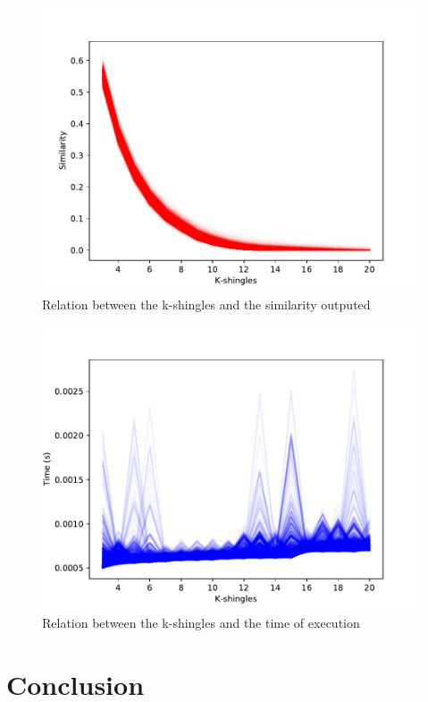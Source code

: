 \documentclass[12pt]{article}
\begin{document}
\begin{figure}[h]
	\includegraphics[scale=1]{JaccardSimilarityValueKshingles} 
  \caption{Relation between the k-shingles and the similarity outputed}
  \label{fig:KShinglesSimilarity}
\end{figure}

\begin{figure}[h]
\includegraphics[scale=1]{JaccardSimilarityTimeKshingles.pdf}
  \caption{Relation between the k-shingles and the time of execution}
  \label{fig:KShinglesTime}
\end{figure}



\section{Conclusion}
\end{document}
